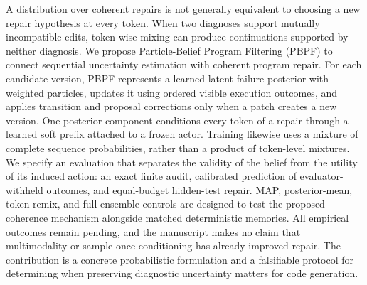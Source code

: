 A distribution over coherent repairs is not generally equivalent to choosing a new repair hypothesis at every token. When two diagnoses support mutually incompatible edits, token-wise mixing can produce continuations supported by neither diagnosis. We propose Particle-Belief Program Filtering (PBPF) to connect sequential uncertainty estimation with coherent program repair. For each candidate version, PBPF represents a learned latent failure posterior with weighted particles, updates it using ordered visible execution outcomes, and applies transition and proposal corrections only when a patch creates a new version. One posterior component conditions every token of a repair through a learned soft prefix attached to a frozen actor. Training likewise uses a mixture of complete sequence probabilities, rather than a product of token-level mixtures. We specify an evaluation that separates the validity of the belief from the utility of its induced action: an exact finite audit, calibrated prediction of evaluator-withheld outcomes, and equal-budget hidden-test repair. MAP, posterior-mean, token-remix, and full-ensemble controls are designed to test the proposed coherence mechanism alongside matched deterministic memories. All empirical outcomes remain pending, and the manuscript makes no claim that multimodality or sample-once conditioning has already improved repair. The contribution is a concrete probabilistic formulation and a falsifiable protocol for determining when preserving diagnostic uncertainty matters for code generation.
